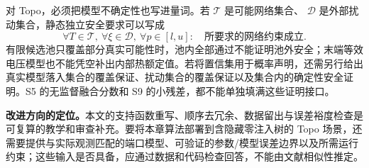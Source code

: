 对 Topo，必须把模型不确定性也写进量词。若 $\mathcal T$ 是可能网络集合、
$\mathcal D$ 是外部扰动集合，静态独立安全要求可以写成
\begin{equation}
 \forall T\in\mathcal T,\ \forall\xi\in\mathcal D,\
 \forall p\in[l,u]:\quad \text{所要求的网络约束成立}.
 \label{eq:oe_s11_topo_interface}
\end{equation}
有限候选池只覆盖部分真实可能性时，池内全部通过不能证明池外安全；末端等效电压模型也不能凭空补出内部热额定值。若将置信集用于概率声明，还需另行给出真实模型落入集合的覆盖保证、扰动集合的覆盖保证以及集合内的确定性安全证明。S5 的无监督融合分数和 S9 的小残差，都不能单独填满这些证明接口。

\textbf{改进方向的定位。}本文的支持函数重写、顺序去冗余、数据留出与误差裕度检查是可复算的教学和审查补充。要将本章算法部署到含隐藏零注入树的 Topo 场景，还需要提供与实际观测匹配的端口模型、可验证的参数/模型误差边界以及所需运行约束；这些输入是否具备，应通过数据和代码检查回答，不能由文献相似性推定。

